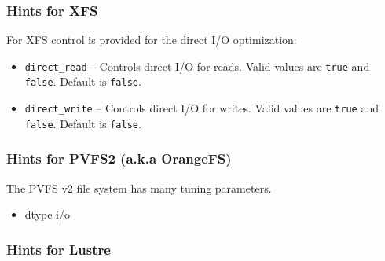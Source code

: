 \subsubsection{Hints for XFS}
\label{sec:hints_xfs}
For XFS control is provided for the direct I/O optimization:
\begin{itemize}
\item \texttt{direct\_read} -- Controls direct I/O for reads.  Valid
values are \texttt{true} and \texttt{false}.  Default is \texttt{false}.
\item \texttt{direct\_write} -- Controls direct I/O for writes.  Valid
values are \texttt{true} and \texttt{false}.  Default is \texttt{false}.
\end{itemize}

\subsubsection{Hints for PVFS2 (a.k.a OrangeFS)}
\label{sec:hints_pvfs}

The PVFS v2 file system has many tuning parameters. 
\begin{itemize}
\item dtype i/o
\end{itemize}

\subsubsection{Hints for Lustre}

